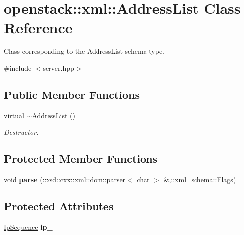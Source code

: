 \hypertarget{classopenstack_1_1xml_1_1AddressList}{
\section{openstack::xml::AddressList Class Reference}
\label{classopenstack_1_1xml_1_1AddressList}
}


Class corresponding to the AddressList schema type.  




{\ttfamily \#include $<$server.hpp$>$}

\subsection*{Public Member Functions}
\begin{DoxyCompactItemize}
\item 
\hypertarget{classopenstack_1_1xml_1_1AddressList_a11c9654acab0847c1d55fec8441d32e3}{
virtual \hyperlink{classopenstack_1_1xml_1_1AddressList_a11c9654acab0847c1d55fec8441d32e3}{$\sim$AddressList} ()}
\label{classopenstack_1_1xml_1_1AddressList_a11c9654acab0847c1d55fec8441d32e3}

\begin{DoxyCompactList}\small\item\em Destructor. \item\end{DoxyCompactList}\end{DoxyCompactItemize}
\subsection*{Protected Member Functions}
\begin{DoxyCompactItemize}
\item 
\hypertarget{classopenstack_1_1xml_1_1AddressList_a7ef72d69902d313b3f82fd2eafa2b025}{
void {\bfseries parse} (::xsd::cxx::xml::dom::parser$<$ char $>$ \&,::\hyperlink{namespacexml__schema_affb4c227cbd9aa7453dd1dc5a1401943}{xml\_\-schema::Flags})}
\label{classopenstack_1_1xml_1_1AddressList_a7ef72d69902d313b3f82fd2eafa2b025}

\end{DoxyCompactItemize}
\subsection*{Protected Attributes}
\begin{DoxyCompactItemize}
\item 
\hypertarget{classopenstack_1_1xml_1_1AddressList_aa1fe6f66e1f5225cea810d51646f502b}{
\hyperlink{classopenstack_1_1xml_1_1AddressList_ac04d0089c0ec07b9d63eb6ea5bb1bdf4}{IpSequence} {\bfseries ip\_\-}}
\label{classopenstack_1_1xml_1_1AddressList_aa1fe6f66e1f5225cea810d51646f502b}

\end{DoxyCompactItemize}
